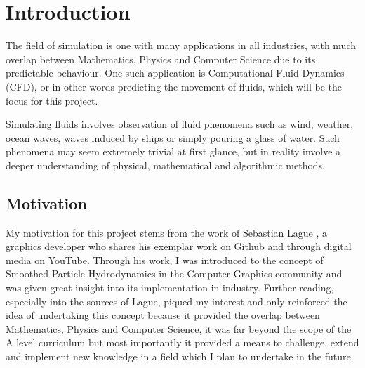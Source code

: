 \documentclass[write-up.tex]{subfiles}
\begin{document}
\section{Introduction}
The field of simulation is one with many applications in all industries, with much overlap between Mathematics, Physics and Computer Science due to its predictable behaviour. One such application is Computational Fluid Dynamics (CFD), or in other words predicting the movement of fluids, which will be the focus for this project.

Simulating fluids involves observation of fluid phenomena such as wind, weather, ocean waves, waves induced by ships or simply pouring a glass of water. Such phenomena may seem extremely trivial at first glance, but in reality involve a deeper understanding of physical, mathematical and algorithmic methods.


\subsection{Motivation}

My motivation for this project stems from the work of Sebastian Lague \cite{Lague}, a graphics developer who shares his exemplar work on \href{https://github.com/}{Github} and through digital media on \href{https://youtube.com}{YouTube}. Through his work, I was introduced to the concept of Smoothed Particle Hydrodynamics in the Computer Graphics community and was given great insight into its implementation in industry. Further reading, especially into the sources of Lague, piqued my interest and only reinforced the idea of undertaking this concept because it provided the overlap between Mathematics, Physics and Computer Science, it was far beyond the scope of the A level curriculum but most importantly it provided a means to challenge, extend and implement new knowledge in a field which I plan to undertake in the future.
\end{document}
